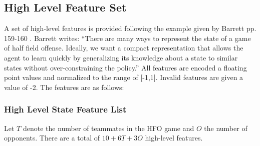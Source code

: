 \documentclass[12pt]{article}
\begin{document}
\subsection{High Level Feature Set}
A set of high-level features is provided following the example given
by Barrett pp. 159-160 \cite{THESIS14-Barrett}. Barrett writes:
``There are many ways to represent the state of a game of half field
offense.  Ideally, we want a compact representation that allows the
agent to learn quickly by generalizing its knowledge about a state to
similar states without over-constraining the policy.'' All features
are encoded a floating point values and normalized to the range of
[-1,1]. Invalid features are given a value of -2. The features are as
follows:

\subsubsection{High Level State Feature List}
Let $T$ denote the number of teammates in the HFO game and $O$ the
number of opponents. There are a total of $10 + 6T + 3O$ high-level
features.
\end{document}
